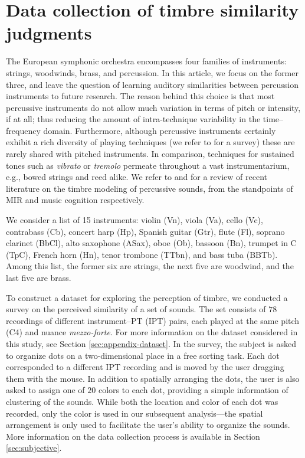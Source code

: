 \documentclass{bmcart}
\makeatletter
\newcommand*{\eg}{e.g.,\@\xspace}
\makeatother
\begin{document}


\section*{Data collection of timbre similarity judgments}
\label{sec:survey}

The European symphonic orchestra encompasses four families of instruments: strings, woodwinds, brass, and percussion.
In this article, we focus on the former three, and leave the question of learning auditory similarities between percussion instruments to future research.
The reason behind this choice is that most percussive instruments do not allow much variation in terms of pitch or intensity, if at all; thus reducing the amount of intra-technique variability in the time--frequency domain.
Furthermore, although percussive instruments certainly exhibit a rich diversity of playing techniques (we refer to \cite{peinkofer1976book} for a survey) these are rarely shared with pitched instruments.
In comparison, techniques for sustained tones such as \emph{vibrato} or \emph{tremolo} permeate throughout a vast instrumentarium, \eg{} bowed strings and reed alike.
We refer to \cite{x} and \cite{x} for a review of recent literature on the timbre modeling of percussive sounds, from the standpoints of MIR and music cognition respectively. %

We consider a list of 15 instruments: violin (Vn), viola (Va), cello (Vc), contrabass (Cb), concert harp (Hp), Spanish guitar (Gtr), flute (Fl), soprano clarinet (BbCl), alto saxophone (ASax), oboe (Ob), bassoon (Bn), trumpet in C (TpC), French horn (Hn), tenor trombone (TTbn), and bass tuba (BBTb). %
Among this list, the former six are strings, the next five are woodwind, and the last five are brass.



To construct a dataset for exploring the perception of timbre, we conducted a survey on the perceived similarity of a set of sounds.
The set consists of $78$ recordings of different instrument--PT (IPT) pairs, each played at the same pitch (C4) and nuance \textit{mezzo-forte}. For more information on the dataset considered in this study, see Section \ref{sec:appendix-dataset}.
In the survey, the subject is asked to organize dots on a two-dimensional place in a free sorting task.
Each dot corresponded to a different IPT recording and is moved by the user dragging them with the mouse.
In addition to spatially arranging the dots, the user is also asked to assign one of $20$ colors to each dot, providing a simple information of clustering of the sounds.
While both the location and color of each dot was recorded, only the color is used in our subsequent analysis---the spatial arrangement is only used to facilitate the user's ability to organize the sounds.
More information on the data collection process is available in  Section \ref{sec:subjective}.
\end{document}
